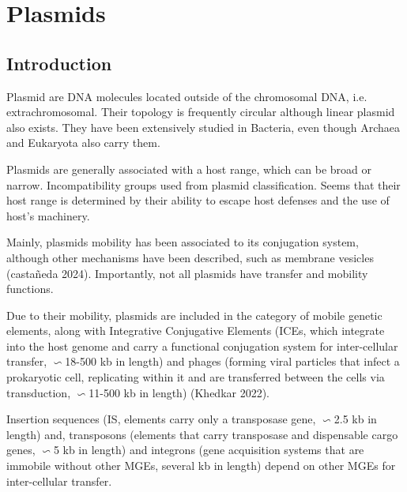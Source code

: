 \chapter{Plasmids}\label{chp:Plasmids}

\minitoc
 

\section{Introduction}
Plasmid are DNA molecules located outside of the chromosomal DNA, i.e. extrachromosomal. Their topology is frequently 
circular although linear plasmid also exists. They have been extensively studied in Bacteria, even though Archaea and 
Eukaryota also carry them. 

Plasmids are generally associated with a host range, which can be broad or narrow. Incompatibility groups used from plasmid 
classification. Seems that their host range is determined by their ability to escape host defenses and the use of host's machinery. 

Mainly, plasmids mobility has been associated to its conjugation system, although other mechanisms have been described, 
such as membrane vesicles (castañeda 2024). Importantly, not all plasmids have transfer and mobility functions. 

Due to their mobility, plasmids are included in the category of mobile genetic elements, along with 
Integrative Conjugative Elements (ICEs, which integrate into the host genome and carry a functional conjugation system for 
inter-cellular transfer, \(\backsim\)18-500 kb in length) and phages (forming viral particles that infect a prokaryotic cell, 
replicating within it and are transferred between the cells via transduction, \(\backsim\)11-500 kb in length) (Khedkar 2022). 

Insertion sequences (IS, elements carry only a transposase gene, \(\backsim\)2.5 kb in length) and, transposons (elements 
that carry transposase and dispensable cargo genes, \(\backsim\)5 kb in length) and integrons (gene acquisition systems 
that are immobile without other MGEs, several kb in length) depend on other MGEs for inter-cellular transfer.


